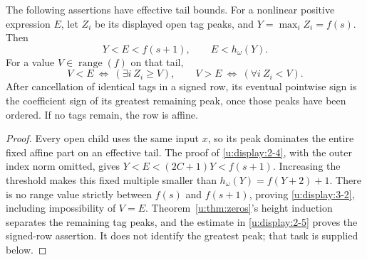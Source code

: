 \begin{lemma}\label{u:lem:cells}
The following assertions have effective tail bounds.
For a nonlinear positive expression $E$, let $Z_i$ be its displayed open
tag peaks, and $Y=\max_i Z_i=f(s)$. Then
\begin{equation}
              Y<E<f(s+1),\qquad E<h_\omega(Y).        \label{u:display:3-1}
\end{equation}
For a value $V\in\operatorname{range}(f)$ on that tail,
\begin{equation}
 V<E\ \Longleftrightarrow\ (\exists i\ Z_i\ge V),\qquad
 V>E\ \Longleftrightarrow\ (\forall i\ Z_i<V).       \label{u:display:3-2}
\end{equation}
After cancellation of identical tags in a signed row, its eventual
pointwise sign is the coefficient sign of its greatest remaining peak,
once those peaks have been ordered. If no tags remain, the row is affine.
\end{lemma}
\begin{proof}
Every open child uses the same input $x$, so its peak dominates the entire
fixed affine part on an effective tail. The proof of \eqref{u:display:2-4}, with the
outer index norm omitted, gives $Y<E<(2C+1)Y<f(s+1)$.
Increasing the threshold makes this fixed multiple smaller than
$h_\omega(Y)=f(Y+2)+1$. There is no range value strictly between $f(s)$
and $f(s+1)$, proving \eqref{u:display:3-2}, including impossibility of $V=E$.
Theorem~\ref{u:thm:zeros}'s height induction separates the remaining tag peaks,
and the estimate in \eqref{u:display:2-5} proves the signed-row assertion. It does not
identify the greatest peak; that task is supplied below.
\end{proof}

